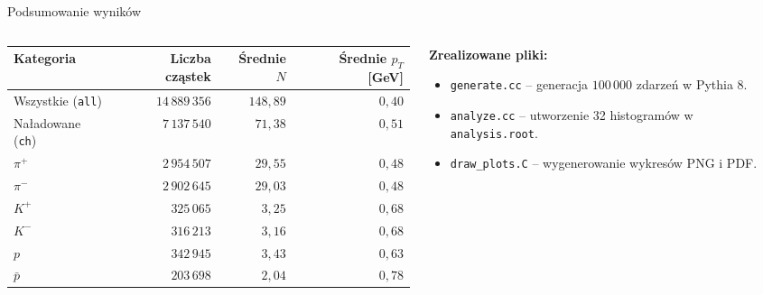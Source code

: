 \documentclass[aspectratio=169, 10pt]{beamer}
\begin{document}
\begin{frame}{Podsumowanie wyników}
  \begin{columns}[T, onlytextwidth]
    \begin{column}{0.58\textwidth}
      \begin{table}
        \centering
        \footnotesize
        \setlength{\tabcolsep}{4.5pt}
        \begin{tabular}{@{}lrrr@{}}
          \toprule
          Kategoria & Liczba cząstek & Średnie $N$ & Średnie $p_T$ [GeV] \\
          \midrule
          Wszystkie (\texttt{all}) & $14\,889\,356$ & $148{,}89$ & $0{,}40$ \\
          Naładowane (\texttt{ch}) & $7\,137\,540$ & $71{,}38$ & $0{,}51$ \\
          \midrule
          $\pi^{+}$ & $2\,954\,507$ & $29{,}55$ & $0{,}48$ \\
          $\pi^{-}$ & $2\,902\,645$ & $29{,}03$ & $0{,}48$ \\
          $K^{+}$ & $325\,065$ & $3{,}25$ & $0{,}68$ \\
          $K^{-}$ & $316\,213$ & $3{,}16$ & $0{,}68$ \\
          $p$ & $342\,945$ & $3{,}43$ & $0{,}63$ \\
          $\bar{p}$ & $203\,698$ & $2{,}04$ & $0{,}78$ \\
          \bottomrule
        \end{tabular}
      \end{table}
    \end{column}

    \begin{column}{0.38\textwidth}
      \textbf{Zrealizowane pliki:}
      \small
      \begin{itemize}
        \item \texttt{generate.cc} -- generacja $100\,000$ zdarzeń w Pythia 8.
        \item \texttt{analyze.cc} -- utworzenie 32 histogramów w \texttt{analysis.root}.
        \item \texttt{draw\_plots.C} -- wygenerowanie wykresów PNG i PDF.
      \end{itemize}
    \end{column}
  \end{columns}
\end{frame}
\end{document}

